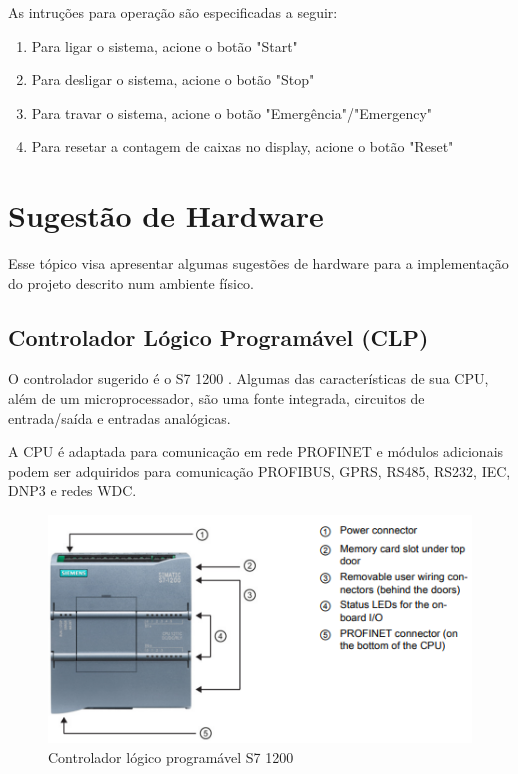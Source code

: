 \documentclass[
	12pt,				%
	openright,			%
	oneside,			%
	a4paper,			%
	english,			%
	brazil,				%
	]{abntex2}
\begin{document}
As intruções para operação são especificadas a seguir:
\begin{enumerate}
    \item Para ligar o sistema, acione o botão "Start"
    \item Para desligar o sistema, acione o botão "Stop"
    \item Para travar o sistema, acione o botão "Emergência"/"Emergency"
    \item Para resetar a contagem de caixas no display, acione o botão "Reset"
\end{enumerate}

\chapter{Sugestão de Hardware}

Esse tópico visa apresentar algumas sugestões de hardware para a implementação do projeto descrito num ambiente físico. 

\section{Controlador Lógico Programável (CLP)}

O controlador sugerido é o S7 1200 \cite{s71200manual2012}. Algumas das características de sua CPU, além de um microprocessador, são uma fonte integrada, circuitos de entrada/saída e entradas analógicas.

A CPU é adaptada para comunicação em rede PROFINET e módulos adicionais podem ser adquiridos para comunicação PROFIBUS, GPRS, RS485, RS232, IEC, DNP3 e redes WDC.

\begin{figure}[H]
\centering
\includegraphics[width=1\linewidth]{Imagens/i9.PNG}
\caption{Controlador lógico programável S7 1200}
\label{fig:clp_sugerido}
\end{figure}
\end{document}
